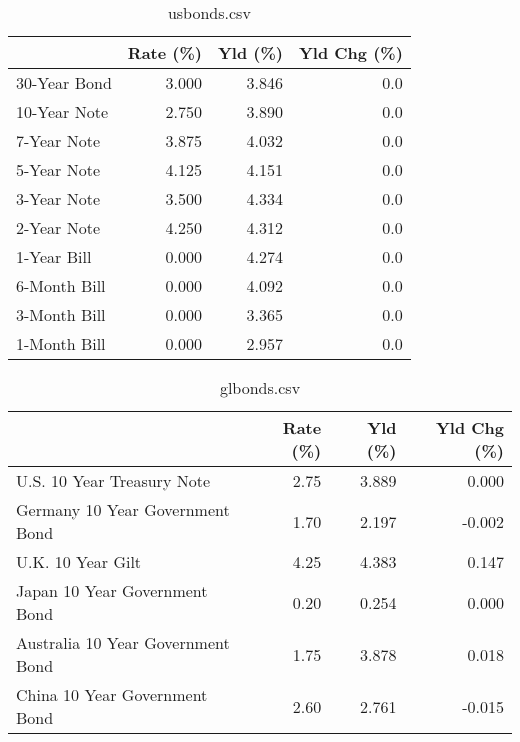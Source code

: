 \documentclass{article}%
\begin{document}
%


\begin{table}[htbp]%
\caption{usbonds.csv}%
\centering%
\begin{adjustbox}{width=1\textwidth}%
\begin{tabular}{lrrr}
\toprule
             &  Rate (\%) &  Yld (\%) &  Yld Chg (\%) \\
\midrule
30-Year Bond &     3.000 &    3.846 &          0.0 \\
10-Year Note &     2.750 &    3.890 &          0.0 \\
 7-Year Note &     3.875 &    4.032 &          0.0 \\
 5-Year Note &     4.125 &    4.151 &          0.0 \\
 3-Year Note &     3.500 &    4.334 &          0.0 \\
 2-Year Note &     4.250 &    4.312 &          0.0 \\
 1-Year Bill &     0.000 &    4.274 &          0.0 \\
6-Month Bill &     0.000 &    4.092 &          0.0 \\
3-Month Bill &     0.000 &    3.365 &          0.0 \\
1-Month Bill &     0.000 &    2.957 &          0.0 \\
\bottomrule
\end{tabular}
%
\end{adjustbox}%
\end{table}

%


\begin{table}[htbp]%
\caption{glbonds.csv}%
\centering%
\begin{adjustbox}{width=1\textwidth}%
\begin{tabular}{lrrr}
\toprule
                                  &  Rate (\%) &  Yld (\%) &  Yld Chg (\%) \\
\midrule
       U.S. 10 Year Treasury Note &      2.75 &    3.889 &        0.000 \\
  Germany 10 Year Government Bond &      1.70 &    2.197 &       -0.002 \\
                U.K. 10 Year Gilt &      4.25 &    4.383 &        0.147 \\
    Japan 10 Year Government Bond &      0.20 &    0.254 &        0.000 \\
Australia 10 Year Government Bond &      1.75 &    3.878 &        0.018 \\
    China 10 Year Government Bond &      2.60 &    2.761 &       -0.015 \\
\bottomrule
\end{tabular}
%
\end{adjustbox}%
\end{table}
\end{document}

